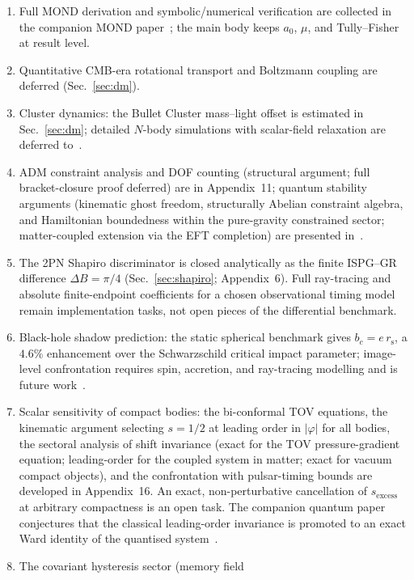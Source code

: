 \documentclass[aps,prd,onecolumn,superscriptaddress,nofootinbib,showpacs,12pt]{revtex4-2}
\newcommand{\rs}{r_{\mathrm{s}}}
\newcommand{\azero}{a_{0}}
\begin{document}
\begin{enumerate}
\item Full MOND derivation and symbolic/numerical
  verification are collected in the companion MOND paper~\cite{Lotishvili2026MOND}; the main body
  keeps $\azero$, $\mu$, and Tully--Fisher at result level.
\item Quantitative CMB-era rotational transport and Boltzmann
  coupling are deferred (Sec.~\ref{sec:dm}).
\item Cluster dynamics: the Bullet Cluster mass--light offset
  is estimated in Sec.~\ref{sec:dm}; detailed $N$-body
  simulations with scalar-field relaxation are deferred
  to~\cite{Lotishvili2026}.
\item ADM constraint analysis and DOF counting (structural
  argument; full bracket-closure proof deferred) are in
  Appendix~11; quantum stability arguments (kinematic
  ghost freedom, structurally Abelian constraint algebra,
  and Hamiltonian boundedness within the pure-gravity
  constrained sector; matter-coupled extension via the EFT
  completion) are presented in~\cite{Lotishvili2026Q}.
\item The 2PN Shapiro discriminator is closed analytically as
  the finite ISPG--GR difference
  $\Delta B=\pi/4$ (Sec.~\ref{sec:shapiro}; Appendix~6).
  Full ray-tracing and absolute finite-endpoint coefficients
  for a chosen observational timing model remain implementation
  tasks, not open pieces of the differential benchmark.
\item Black-hole shadow prediction:
  the static spherical benchmark gives
  $b_c=e\,\rs$, a $4.6\%$ enhancement over the
  Schwarzschild critical impact parameter; image-level
  confrontation requires spin, accretion, and ray-tracing
  modelling and is future work~\cite{Lotishvili2026}.
\item Scalar sensitivity of compact bodies: the
  bi-conformal TOV equations, the kinematic argument
  selecting $s = 1/2$ at leading order in $|\varphi|$
  for all bodies, the sectoral analysis of shift
  invariance (exact for the TOV pressure-gradient
  equation; leading-order for the coupled system in
  matter; exact for vacuum compact objects), and the
  confrontation with pulsar-timing bounds are developed
  in Appendix~16.  An exact, non-perturbative cancellation
  of $s_{\mathrm{excess}}$ at arbitrary compactness is
  an open task.  The companion quantum paper conjectures
  that the classical leading-order invariance is
  promoted to an exact Ward identity of the quantised
  system~\cite{Lotishvili2026Q}.
\item The covariant hysteresis sector (memory field

\end{enumerate}
\end{document}

